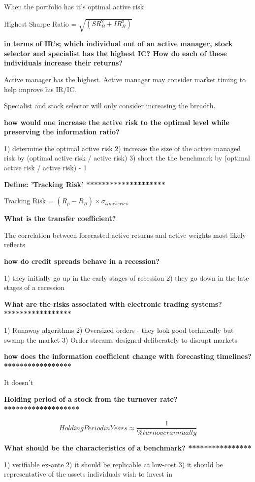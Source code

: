 \documentclass[12pt]{article}
\begin{document}
{When the portfolio has it's optimal active risk

Highest Sharpe Ratio = $\sqrt{(SR_B^2 + IR_B^2)}$

\textbf{in terms of IR's; which individual out of an active manager, stock selector and specialist has the highest IC? How do each of these individuals increase their returns?}

Active manager has the highest. Active manager may consider market timing to help improve his IR/IC. 

Specialist and stock selector will only consider increasing the breadth. 

\textbf{how would one increase the active risk to the optimal level while preserving the information ratio?}

1) determine the optimal active risk
2) increase the size of the active managed risk by (optimal active risk / active risk)
3) short the the benchmark by (optimal active risk / active risk) - 1

\textbf{Define: 'Tracking Risk'   ********************}

Tracking Risk = $(R_p - R_B) \times \sigma_{time series}$

\textbf{What is the transfer coefficient?}

The correlation between forecasted active returns and active weights most likely reflects

\textbf{how do credit spreads behave in a recession?}

1) they initially go up in the early stages of recession
2) they go down in the late stages of a recession

\textbf{What are the risks associated with electronic trading systems?  *****************}

1) Runaway algorithms 
2) Oversized orders - they look good technically but swamp the market
3) Order streams designed deliberately to disrupt markets

\textbf{how does the information coefficient change with forecasting timelines?  *****************}

It doesn't 

\textbf{Holding period of a stock from the turnover rate? *******************}

$$
Holding Period in Years \approx \dfrac{1}{\% turnover annually}
$$

\textbf{What should be the characteristics of a benchmark? ****************}

1) verifiable ex-ante
2) it should be replicable at low-cost
3) it should be representative of the assets individuals wish to invest in

}
\end{document}
